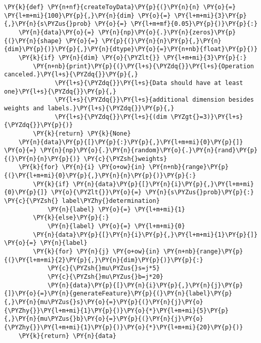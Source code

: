 {\par%
\vspace{-1\baselineskip}%
}%
\begin{notebookcell}[]%
\begin{addmargin}[\cellleftmargin]{0em}%
{\smaller%
\par%
%
\vspace{-1\smallerfontscale}%
\begin{Verbatim}[commandchars=\\\{\}]
\PY{k}{def} \PY{n+nf}{createToyData}\PY{p}{(}\PY{n}{n} \PY{o}{=} \PY{l+m+mi}{100}\PY{p}{,}\PY{n}{dim} \PY{o}{=} \PY{l+m+mi}{3}\PY{p}{,}\PY{n}{s\PYZus{}prob} \PY{o}{=} \PY{l+m+mf}{0.05}\PY{p}{)}\PY{p}{:}
    \PY{n}{data}\PY{o}{=} \PY{n}{np}\PY{o}{.}\PY{n}{zeros}\PY{p}{(}\PY{n}{shape} \PY{o}{=} \PY{p}{(}\PY{n}{n}\PY{p}{,}\PY{n}{dim}\PY{p}{)}\PY{p}{,}\PY{n}{dtype}\PY{o}{=}\PY{n+nb}{float}\PY{p}{)}
    \PY{k}{if} \PY{n}{dim} \PY{o}{\PYZlt{}} \PY{l+m+mi}{3}\PY{p}{:}
        \PY{n+nb}{print}\PY{p}{(}\PY{l+s}{\PYZdq{}}\PY{l+s}{Operation canceled.}\PY{l+s}{\PYZdq{}}\PY{p}{,}
              \PY{l+s}{\PYZdq{}}\PY{l+s}{Data should have at least one}\PY{l+s}{\PYZdq{}}\PY{p}{,}
              \PY{l+s}{\PYZdq{}}\PY{l+s}{additional dimension besides weights and labels.}\PY{l+s}{\PYZdq{}}\PY{p}{,}
              \PY{l+s}{\PYZdq{}}\PY{l+s}{(dim \PYZgt{}=3)}\PY{l+s}{\PYZdq{}}\PY{p}{)}
        \PY{k}{return} \PY{k}{None}
    \PY{n}{data}\PY{p}{[}\PY{p}{:}\PY{p}{,}\PY{l+m+mi}{0}\PY{p}{]} \PY{o}{=} \PY{n}{np}\PY{o}{.}\PY{n}{random}\PY{o}{.}\PY{n}{rand}\PY{p}{(}\PY{n}{n}\PY{p}{)} \PY{c}{\PYZsh{}weights}
    \PY{k}{for} \PY{n}{i} \PY{o+ow}{in} \PY{n+nb}{range}\PY{p}{(}\PY{l+m+mi}{0}\PY{p}{,}\PY{n}{n}\PY{p}{)}\PY{p}{:}
        \PY{k}{if} \PY{n}{data}\PY{p}{[}\PY{n}{i}\PY{p}{,}\PY{l+m+mi}{0}\PY{p}{]} \PY{o}{\PYZlt{}}\PY{o}{=} \PY{n}{s\PYZus{}prob}\PY{p}{:} \PY{c}{\PYZsh{} label\PYZhy{}determination}
            \PY{n}{label} \PY{o}{=} \PY{l+m+mi}{1}
        \PY{k}{else}\PY{p}{:}
            \PY{n}{label} \PY{o}{=} \PY{l+m+mi}{0}
        \PY{n}{data}\PY{p}{[}\PY{n}{i}\PY{p}{,}\PY{l+m+mi}{1}\PY{p}{]} \PY{o}{=} \PY{n}{label}
        \PY{k}{for} \PY{n}{j} \PY{o+ow}{in} \PY{n+nb}{range}\PY{p}{(}\PY{l+m+mi}{2}\PY{p}{,}\PY{n}{dim}\PY{p}{)}\PY{p}{:}
            \PY{c}{\PYZsh{}mu\PYZus{}s=j*5}
            \PY{c}{\PYZsh{}mu\PYZus{}b=j*20}
            \PY{n}{data}\PY{p}{[}\PY{n}{i}\PY{p}{,}\PY{n}{j}\PY{p}{]}\PY{o}{=}\PY{n}{generateFeature}\PY{p}{(}\PY{n}{label}\PY{p}{,}\PY{n}{mu\PYZus{}s}\PY{o}{=}\PY{p}{(}\PY{n}{j}\PY{o}{\PYZhy{}}\PY{l+m+mi}{1}\PY{p}{)}\PY{o}{*}\PY{l+m+mi}{5}\PY{p}{,}\PY{n}{mu\PYZus{}b}\PY{o}{=}\PY{p}{(}\PY{n}{j}\PY{o}{\PYZhy{}}\PY{l+m+mi}{1}\PY{p}{)}\PY{o}{*}\PY{l+m+mi}{20}\PY{p}{)}
    \PY{k}{return} \PY{n}{data}
\end{Verbatim}
%
\par%
\vspace{-1\smallerfontscale}}%
\end{addmargin}
\end{notebookcell}


